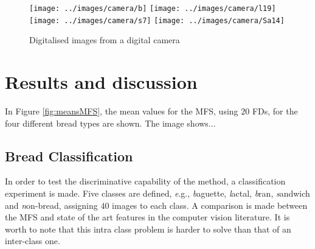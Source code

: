 \begin{figure}[htb]
\centering
\texttt{[image: ../images/camera/b]}
\texttt{[image: ../images/camera/l19]}
\texttt{[image: ../images/camera/s7]}
\texttt{[image: ../images/camera/Sa14]}
\caption{Digitalised images from a digital camera}
\label{fig:camera}
\end{figure}




\section{Results and discussion}
\label{sec:9}


In Figure \ref{fig:meansMFS}, the mean values for the MFS, using $20$ FDs, for the four different bread types are shown. The image shows...

\subsection{Bread Classification}
\label{sec:10}

In order to test the discriminative capability of the method, a classification experiment is made. Five classes are defined, {\emph e.g.}, {\emph baguette}, {\emph lactal}, {\emph bran}, {\emph sandwich} and {\emph non-bread}, assigning $40$ images to each class. A comparison is made between the MFS and state of the art features in the computer vision literature. It is worth to note that this intra class problem is harder to solve than that of an inter-class one. 

